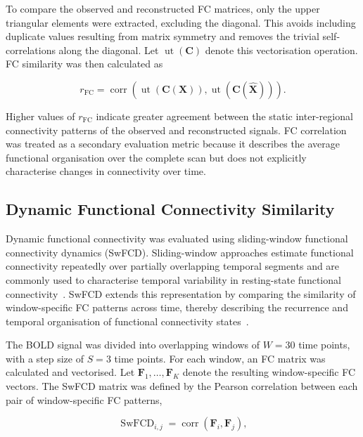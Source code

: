 To compare the observed and reconstructed FC matrices, only the upper
triangular elements were extracted, excluding the diagonal. This avoids
including duplicate values resulting from matrix symmetry and removes the
trivial self-correlations along the diagonal. Let
$\operatorname{ut}(\mathbf{C})$ denote this vectorisation operation. FC
similarity was then calculated as

\begin{equation}
    r_{\mathrm{FC}}
    =
    \operatorname{corr}
    \left(
        \operatorname{ut}\left(\mathbf{C}(\mathbf{X})\right),
        \operatorname{ut}\left(\mathbf{C}(\hat{\mathbf{X}})\right)
    \right).
\end{equation}

Higher values of $r_{\mathrm{FC}}$ indicate greater agreement between the
static inter-regional connectivity patterns of the observed and
reconstructed signals. FC correlation was treated as a secondary
evaluation metric because it describes the average functional organisation
over the complete scan but does not explicitly characterise changes in
connectivity over time.

\subsection{Dynamic Functional Connectivity Similarity}

Dynamic functional connectivity was evaluated using sliding-window
functional connectivity dynamics (SwFCD). Sliding-window approaches estimate
functional connectivity repeatedly over partially overlapping temporal
segments and are commonly used to characterise temporal variability in
resting-state functional connectivity~\cite{Hutchison2013}. SwFCD
extends this representation by comparing the similarity of window-specific
FC patterns across time, thereby describing the recurrence and temporal
organisation of functional connectivity states~\cite{Hansen2015}.

The BOLD signal was divided into overlapping windows of $W=30$ time points,
with a step size of $S=3$ time points. For each window, an FC matrix was
calculated and vectorised. Let
$\mathbf{F}_1,\ldots,\mathbf{F}_K$ denote the resulting window-specific FC
vectors. The SwFCD matrix was defined by the Pearson correlation between
each pair of window-specific FC patterns,

\begin{equation}
    \operatorname{SwFCD}_{i,j}
    =
    \operatorname{corr}
    \left(
        \mathbf{F}_i,
        \mathbf{F}_j
    \right),
\end{equation}

